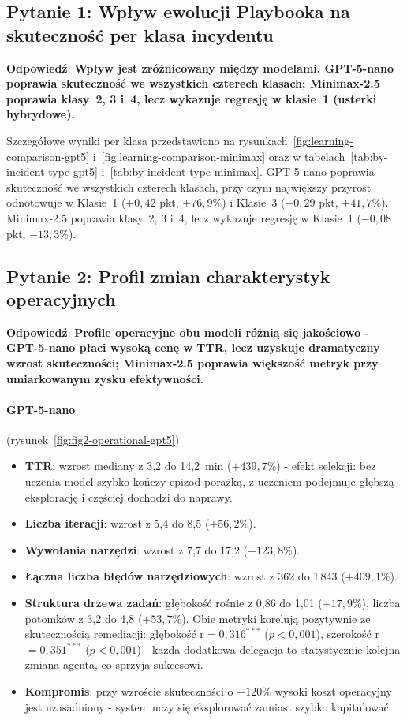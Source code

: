 \subsection{Pytanie 1: Wpływ ewolucji Playbooka na skuteczność per klasa incydentu}

\textbf{Odpowiedź}: \textbf{Wpływ jest zróżnicowany między modelami. GPT-5-nano poprawia skuteczność we wszystkich czterech klasach; Minimax-2.5 poprawia klasy~2, 3 i~4, lecz wykazuje regresję w klasie~1 (usterki hybrydowe).}

Szczegółowe wyniki per klasa przedstawiono na rysunkach~\ref{fig:learning-comparison-gpt5} i~\ref{fig:learning-comparison-minimax} oraz w tabelach~\ref{tab:by-incident-type-gpt5} i~\ref{tab:by-incident-type-minimax}. GPT-5-nano poprawia skuteczność we wszystkich czterech klasach, przy czym największy przyrost odnotowuje w Klasie~1 ($+0{,}42$ pkt, $+76{,}9\%$) i Klasie~3 ($+0{,}29$ pkt, $+41{,}7\%$). Minimax-2.5 poprawia klasy~2, 3 i~4, lecz wykazuje regresję w Klasie~1 ($-0{,}08$ pkt, $-13{,}3\%$).

\subsection{Pytanie 2: Profil zmian charakterystyk operacyjnych}

\textbf{Odpowiedź}: \textbf{Profile operacyjne obu modeli różnią się jakościowo - GPT-5-nano płaci wysoką cenę w TTR, lecz uzyskuje dramatyczny wzrost skuteczności; Minimax-2.5 poprawia większość metryk przy umiarkowanym zysku efektywności.}

\paragraph{GPT-5-nano} (rysunek~\ref{fig:fig2-operational-gpt5})
\begin{itemize}
    \item \textbf{TTR}: wzrost mediany z 3,2 do 14,2~min ($+439{,}7\%$) - efekt selekcji: bez uczenia model szybko kończy epizod porażką, z uczeniem podejmuje głębszą eksplorację i częściej dochodzi do naprawy.
    \item \textbf{Liczba iteracji}: wzrost z 5,4 do 8,5 ($+56{,}2\%$).
    \item \textbf{Wywołania narzędzi}: wzrost z 7,7 do 17,2 ($+123{,}8\%$).
    \item \textbf{Łączna liczba błędów narzędziowych}: wzrost z 362 do 1\,843 ($+409{,}1\%$).
    \item \textbf{Struktura drzewa zadań}: głębokość rośnie z 0,86 do 1,01 ($+17{,}9\%$), liczba potomków z 3,2 do 4,8 ($+53{,}7\%$). Obie metryki korelują pozytywnie ze skutecznością remediacji: głębokość r$=0{,}316^{***}$ ($p{<}0{,}001$), szerokość r$=0{,}351^{***}$ ($p{<}0{,}001$) - każda dodatkowa delegacja to statystycznie kolejna zmiana agenta, co sprzyja sukcesowi.
    \item \textbf{Kompromis}: przy wzroście skuteczności o $+120\%$ wysoki koszt operacyjny jest uzasadniony - system uczy się eksplorować zamiast szybko kapitulować.
\end{itemize}


